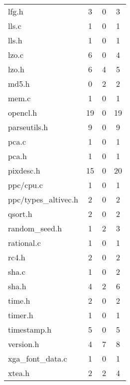 \begin{longtable}{l || c | c | c}
  lfg.h                 & 3         & 0        & 3          \\
  lls.c                 & 1         & 0        & 1          \\
  lls.h                 & 1         & 0        & 1          \\
  lzo.c                 & 6         & 0        & 4          \\
  lzo.h                 & 6         & 4        & 5          \\
  md5.h                 & 0         & 2        & 2          \\
  mem.c                 & 1         & 0        & 1          \\
  opencl.h              & 19        & 0        & 19          \\
  parseutils.h          & 9         & 0        & 9          \\
  pca.c                 & 1         & 0        & 1          \\
  pca.h                 & 1         & 0        & 1          \\
  pixdesc.h             & 15        & 0        & 20          \\
  ppc/cpu.c             & 1         & 0        & 1          \\
  ppc/types\_altivec.h  & 2         & 0        & 2          \\
  qsort.h               & 2         & 0        & 2          \\
  random\_seed.h        & 1         & 2        & 3          \\
  rational.c            & 1         & 0        & 1          \\
  rc4.h                 & 2         & 0        & 2          \\
  sha.c                 & 1         & 0        & 2          \\
  sha.h                 & 4         & 2        & 6          \\
  time.h                & 2         & 0        & 2          \\
  timer.h               & 1         & 0        & 1          \\
  timestamp.h           & 5         & 0        & 5          \\
  version.h             & 4         & 7        & 8          \\
  xga\_font\_data.c     & 1         & 0        & 1          \\
  xtea.h                & 2         & 2        & 4          \\
\end{longtable}

